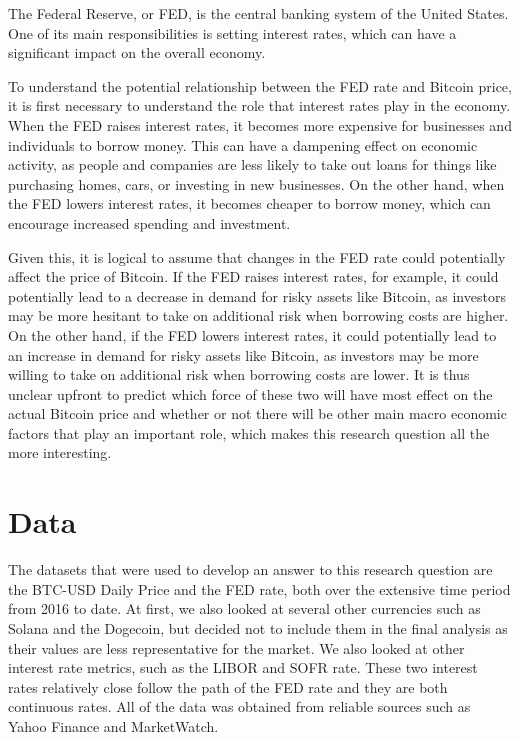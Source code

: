 \documentclass[12pt]{article}
\begin{document}
The Federal Reserve, or FED, is the central banking system of the United States. One of its main responsibilities is setting interest rates, which can have a significant impact on the overall economy. 

To understand the potential relationship between the FED rate and Bitcoin price, it is first necessary to understand the role that interest rates play in the economy. When the FED raises interest rates, it becomes more expensive for businesses and individuals to borrow money. This can have a dampening effect on economic activity, as people and companies are less likely to take out loans for things like purchasing homes, cars, or investing in new businesses. On the other hand, when the FED lowers interest rates, it becomes cheaper to borrow money, which can encourage increased spending and investment.

Given this, it is logical to assume that changes in the FED rate could potentially affect the price of Bitcoin. If the FED raises interest rates, for example, it could potentially lead to a decrease in demand for risky assets like Bitcoin, as investors may be more hesitant to take on additional risk when borrowing costs are higher. On the other hand, if the FED lowers interest rates, it could potentially lead to an increase in demand for risky assets like Bitcoin, as investors may be more willing to take on additional risk when borrowing costs are lower.
\newline
It is thus unclear upfront to predict which force of these two will have most effect on the actual Bitcoin price and whether or not there will be other main macro economic factors that play an important role, which makes this research question all the more interesting. 
\section{Data}

The datasets that were used to develop an answer to this research question are the BTC-USD Daily Price and the FED rate, both over the extensive time period from 2016 to date. At first, we also looked at several other currencies such as Solana and the Dogecoin, but decided not to include them in the final analysis as their values are less representative for the market. We also looked at other interest rate metrics, such as the LIBOR and SOFR rate. These two interest rates relatively close follow the path of the FED rate and they are both continuous rates. All of the data was obtained from reliable sources such as Yahoo Finance and MarketWatch.
\end{document}
